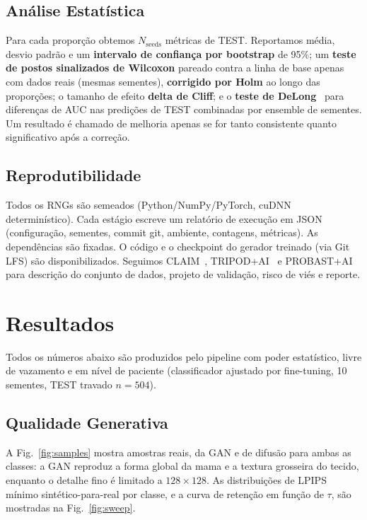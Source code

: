 \documentclass[runningheads]{llncs}
\begin{document}
\subsection{Análise Estatística}
Para cada proporção obtemos $N_\text{seeds}$ métricas de TEST. Reportamos média,
desvio padrão e um \textbf{intervalo de confiança por bootstrap} de 95\%; um
\textbf{teste de postos sinalizados de Wilcoxon} pareado contra a linha de base
apenas com dados reais (mesmas sementes), \textbf{corrigido por Holm} ao longo das
proporções; o tamanho de efeito \textbf{delta de Cliff}; e o \textbf{teste de
DeLong}~\cite{delong1988} para diferenças de AUC nas predições de TEST
combinadas por ensemble de sementes. Um resultado é chamado de melhoria apenas se
for tanto consistente quanto significativo após a correção.

\subsection{Reprodutibilidade}
Todos os RNGs são semeados (Python/NumPy/PyTorch, cuDNN determinístico). Cada
estágio escreve um relatório de execução em JSON (configuração, sementes, commit
git, ambiente, contagens, métricas). As dependências são fixadas. O código e o
checkpoint do gerador treinado (via Git LFS) são disponibilizados. Seguimos
CLAIM~\cite{mongan2020claim}, TRIPOD+AI~\cite{collins2024tripodai} e
PROBAST+AI~\cite{moons2024probastai} para descrição do conjunto de dados, projeto
de validação, risco de viés e reporte.

\section{Resultados}
Todos os números abaixo são produzidos pelo pipeline com poder estatístico, livre
de vazamento e em nível de paciente (classificador ajustado por fine-tuning, 10
sementes, TEST travado $n{=}504$).

\subsection{Qualidade Generativa}
A Fig.~\ref{fig:samples} mostra amostras reais, da GAN e de difusão para ambas as
classes: a GAN reproduz a forma global da mama e a textura grosseira do tecido,
enquanto o detalhe fino é limitado a $128\times128$. As distribuições de LPIPS
mínimo sintético-para-real por classe, e a curva de retenção em função de $\tau$,
são mostradas na Fig.~\ref{fig:sweep}.
\end{document}
